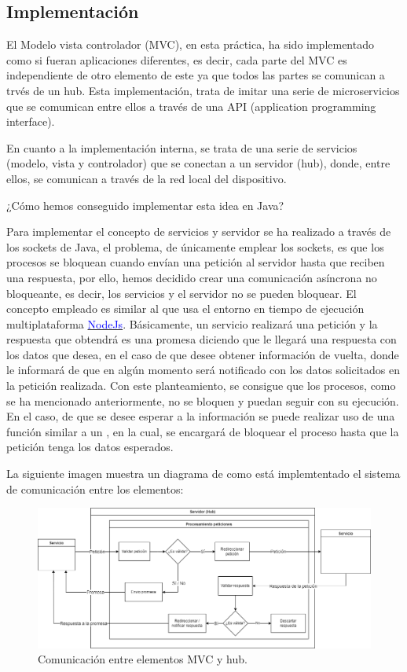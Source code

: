 \subsection{Implementación}

El Modelo vista controlador (MVC), en esta práctica, ha sido implementado como si fueran aplicaciones diferentes, es decir, cada parte del MVC es independiente de otro elemento de este ya que todos las partes se comunican a trvés de un hub. Esta implementación, trata de imitar una serie de microservicios que se comumican entre ellos a través de una API (application programming interface).\bigskip

En cuanto a la implementación interna, se trata de una serie de servicios (modelo, vista y controlador) que se conectan a un servidor (hub), donde, entre ellos, se comunican a través de la red local del dispositivo.\bigskip

¿Cómo hemos conseguido implementar esta idea en Java?\bigskip

Para implementar el concepto de servicios y servidor se ha realizado a través de los sockets de Java, el problema, de únicamente emplear los sockets, es que los procesos se bloquean cuando envían una petición al servidor hasta que reciben una respuesta, por ello, hemos decidido crear una comunicación asíncrona no bloqueante, es decir, los servicios y el servidor no se pueden bloquear. El concepto empleado es similar al que usa el entorno en tiempo de ejecución multiplataforma \href{https://nodejs.org/en}{\textcolor{blue}{NodeJs}}. Básicamente, un servicio realizará una petición y la respuesta que obtendrá es una promesa diciendo que le llegará una respuesta con los datos que desea, en el caso de que desee obtener información de vuelta, donde le informará de que en algún momento será notificado con los datos solicitados en la petición realizada. Con este planteamiento, se consigue que los procesos, como se ha mencionado anteriormente, no se bloquen y puedan seguir con su ejecución. En el caso, de que se desee esperar a la información se puede realizar uso de una función similar a un , en la cual, se encargará de bloquear el proceso hasta que la petición tenga los datos esperados.\bigskip

La siguiente imagen muestra un diagrama de como está implemtentado el sistema de comunicación entre los elementos:

\begin{figure}[!h]
    \centering
    \includegraphics[width=\linewidth]{MVC/img/comunicacion.png}
    \caption{Comunicación entre elementos MVC y hub.}
    \label{fig:comuncacion mvc}
\end{figure}

